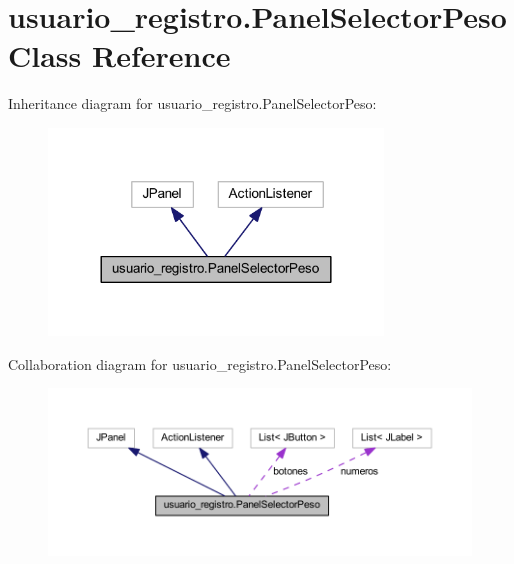 \hypertarget{classusuario__registro_1_1_panel_selector_peso}{}\section{usuario\+\_\+registro.\+Panel\+Selector\+Peso Class Reference}
\label{classusuario__registro_1_1_panel_selector_peso}


Inheritance diagram for usuario\+\_\+registro.\+Panel\+Selector\+Peso\+:
\nopagebreak
\begin{figure}[H]
\begin{center}
\leavevmode
\includegraphics[width=252pt]{classusuario__registro_1_1_panel_selector_peso__inherit__graph}
\end{center}
\end{figure}


Collaboration diagram for usuario\+\_\+registro.\+Panel\+Selector\+Peso\+:
\nopagebreak
\begin{figure}[H]
\begin{center}
\leavevmode
\includegraphics[width=350pt]{classusuario__registro_1_1_panel_selector_peso__coll__graph}
\end{center}
\end{figure}

